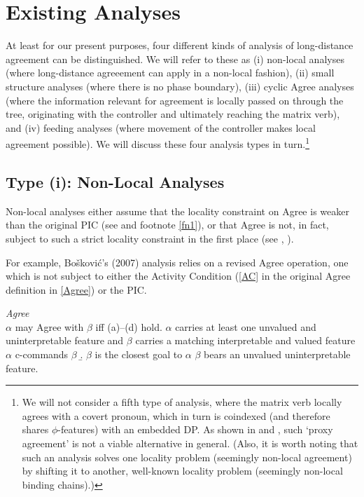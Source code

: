 \documentclass[output=paper
,modfonts
,nonflat]{langsci/langscibook}
\begin{document}
\section{Existing Analyses}

At least for our present purposes, four different kinds of analysis
of long-distance agreement can be distinguished. We will refer to
these as (i) non-local analyses (where long-distance agreeement can
apply in a non-local fashion),  (ii) small structure analyses (where
there is no phase boundary), (iii) cyclic Agree analyses (where the
information relevant for agreement is locally passed on through the
tree, originating with the controller and ultimately reaching the
matrix verb), and (iv) feeding analyses (where movement
of the controller makes 
local agreement possible). We will discuss these four analysis types in
turn.\footnote{We will not consider a fifth type of analysis, where
  the matrix verb locally agrees with a covert pronoun, which in turn
  is coindexed (and therefore shares $\phi$-features) with an
  embedded DP. As shown in \cite{Polinsky&Potsdam:01} and
  \cite{Bhatt&Keine:16:lon}, such `proxy agreement' is not a viable
  alternative in general. (Also, it is worth noting that such an
  analysis solves one locality problem (seemingly non-local agreement)
by shifting it to another, well-known locality problem (seemingly
non-local binding chains).)}

\subsection{Type (i): Non-Local Analyses}

Non-local analyses either assume that the locality constraint on Agree
is weaker than the original PIC (see \cite{Chomsky:01} and footnote
\ref{fn1}), or that Agree is not, in fact, subject to such a strict
locality constraint in the first place (see \cite{Sells:06} \cite{Boskovic:07},
\cite{Keine:16}).

For example, Bo\v{s}kovi{\'c}'s (2007) analysis relies on a revised
Agree operation, one which is not subject to either the  Activity
  Condition (\ref{AC} in the original Agree definition in
\ref{Agree}) or the PIC. 

\ea\label{ex:mueller:7} \label{Agree}{\itshape Agree} \\ $\alpha$ may Agree with $\beta$ iff
(a)--(d) hold.
\ea  $\alpha$ carries at least one unvalued and uninterpretable
      feature and $\beta$ carries a matching interpretable and valued
      feature 
\ex  $\alpha$ c-commands $\beta$
    \b. \label{AgreeClosest}$\beta$ is the closest goal to $\alpha$
\ex \label{AC}$\beta$ bears an unvalued uninterpretable feature.
\z
\z
\end{document}

